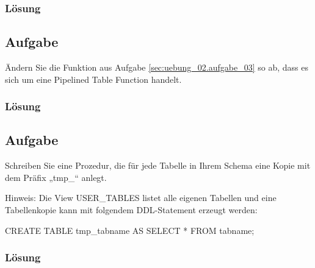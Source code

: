 \subsubsection*{Lösung}
\label{sec:uebung_02.aufgabe_03.loesung}


\subsection{Aufgabe}
\label{sec:uebung_02.aufgabe_04}
Ändern Sie die Funktion aus Aufgabe \ref{sec:uebung_02.aufgabe_03} so ab, dass es sich um eine Pipelined Table Function handelt.

\subsubsection*{Lösung}
\label{sec:uebung_02.aufgabe_04.loesung}


\subsection{Aufgabe}
\label{sec:uebung_02.aufgabe_05}
Schreiben Sie eine Prozedur, die für jede Tabelle in Ihrem Schema eine Kopie mit dem Präfix „tmp\_“ anlegt.

Hinweis: Die View USER\_TABLES listet alle eigenen Tabellen und eine Tabellenkopie kann mit folgendem DDL-Statement erzeugt werden:
\begin{sqlcode}
CREATE TABLE tmp_tabname AS
  SELECT *
  FROM tabname;
\end{sqlcode}

\subsubsection*{Lösung}
\label{sec:uebung_02.aufgabe_05.loesung}


